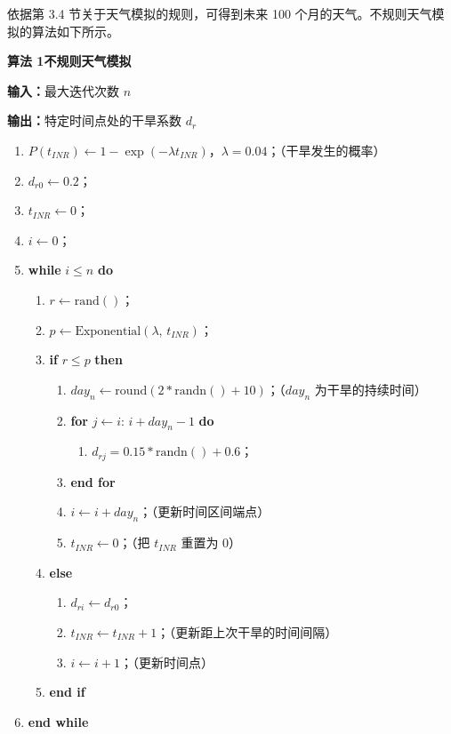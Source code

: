 \documentclass[11pt,a4paper]{ctexart}
\begin{document}
依据第 3.4 节关于天气模拟的规则，可得到未来 100 个月的天气。不规则天气模拟的算法如下所示。

\noindent\textbf{算法 1\quad 不规则天气模拟}

\noindent\textbf{输入：}最大迭代次数 $n$

\noindent\textbf{输出：}特定时间点处的干旱系数 $d_r$

\begin{enumerate}
\item $P(t_{INR})\leftarrow 1-\exp(-\lambda t_{INR})$，$\lambda=0.04$；\quad（干旱发生的概率）
\item $d_{r0}\leftarrow 0.2$；
\item $t_{INR}\leftarrow 0$；
\item $i\leftarrow 0$；
\item \textbf{while} $i\le n$ \textbf{do}
  \begin{enumerate}
  \item $r\leftarrow \mathrm{rand}()$；
  \item $p\leftarrow \mathrm{Exponential}(\lambda,\,t_{INR})$；
  \item \textbf{if} $r\le p$ \textbf{then}
     \begin{enumerate}
     \item $day_n\leftarrow \mathrm{round}(2*\mathrm{randn}()+10)$；\quad（$day_n$ 为干旱的持续时间）
     \item \textbf{for} $j\leftarrow i:\,i+day_n-1$ \textbf{do}
        \begin{enumerate}
        \item $d_{rj}=0.15*\mathrm{randn}()+0.6$；
        \end{enumerate}
     \item \textbf{end for}
     \item $i\leftarrow i+day_n$；\quad（更新时间区间端点）
     \item $t_{INR}\leftarrow 0$；\quad（把 $t_{INR}$ 重置为 0）
     \end{enumerate}
  \item \textbf{else}
     \begin{enumerate}
     \item $d_{ri}\leftarrow d_{r0}$；
     \item $t_{INR}\leftarrow t_{INR}+1$；\quad（更新距上次干旱的时间间隔）
     \item $i\leftarrow i+1$；\quad（更新时间点）
     \end{enumerate}
  \item \textbf{end if}
  \end{enumerate}
\item \textbf{end while}
\end{enumerate}
\end{document}
